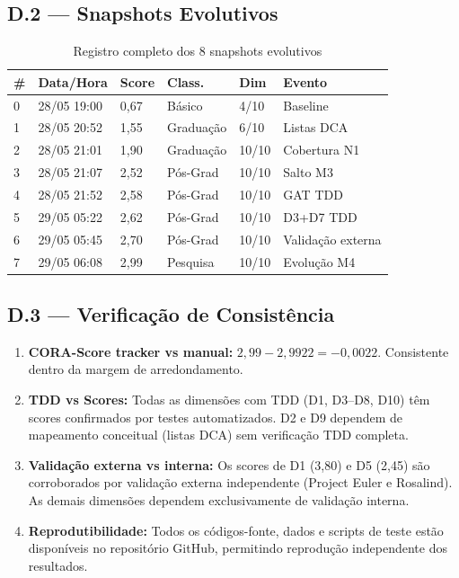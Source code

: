 \documentclass[12pt,a4paper,oneside]{article}
\begin{document}
\subsection{D.2 — Snapshots Evolutivos}

\begin{table}[H]
\centering
\caption{Registro completo dos 8 snapshots evolutivos}
\label{tab:snapshots}
\begin{tabular}{p{}p{}p{}p{}p{}p{}}
\toprule
\textbf{\#} & \textbf{Data/Hora} & \textbf{Score} & \textbf{Class.} & \textbf{Dim} & \textbf{Evento} \\
\midrule
0 & 28/05 19:00 & 0,67 & Básico & 4/10 & Baseline \\
1 & 28/05 20:52 & 1,55 & Graduação & 6/10 & Listas DCA \\
2 & 28/05 21:01 & 1,90 & Graduação & 10/10 & Cobertura N1 \\
3 & 28/05 21:07 & 2,52 & Pós-Grad & 10/10 & Salto M3 \\
4 & 28/05 21:52 & 2,58 & Pós-Grad & 10/10 & GAT TDD \\
5 & 29/05 05:22 & 2,62 & Pós-Grad & 10/10 & D3+D7 TDD \\
6 & 29/05 05:45 & 2,70 & Pós-Grad & 10/10 & Validação externa \\
7 & 29/05 06:08 & 2,99 & Pesquisa & 10/10 & Evolução M4 \\
\bottomrule
\end{tabular}
\end{table}

\subsection{D.3 — Verificação de Consistência}

\begin{enumerate}[label=(\roman*)]
\item \textbf{CORA-Score tracker vs manual:} $2{,}99 - 2{,}9922 = -0{,}0022$.
      Consistente dentro da margem de arredondamento.
\item \textbf{TDD vs Scores:} Todas as dimensões com TDD (D1, D3--D8, D10)
      têm scores confirmados por testes automatizados. D2 e D9 dependem de
      mapeamento conceitual (listas DCA) sem verificação TDD completa.
\item \textbf{Validação externa vs interna:} Os scores de D1 (3,80) e D5 (2,45)
      são corroborados por validação externa independente (Project Euler e
      Rosalind). As demais dimensões dependem exclusivamente de validação
      interna.
\item \textbf{Reprodutibilidade:} Todos os códigos-fonte, dados e scripts de
      teste estão disponíveis no repositório GitHub, permitindo reprodução
      independente dos resultados.
\end{enumerate}
\end{document}
